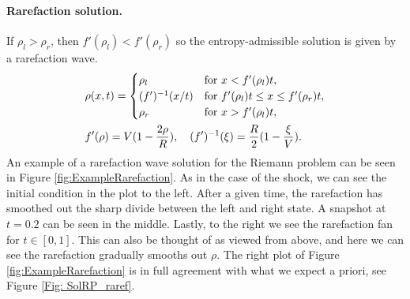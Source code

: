 \documentclass[10pt]{article}
\numberwithin{equation}{section}
\begin{document}
\paragraph{Rarefaction solution.} If $\rho_l > \rho_r$, then $f'(\rho_l) < f'(\rho_r) $ so the entropy-admissible solution is given by a rarefaction wave.
\begin{align}
    & \rho(x,t) = \begin{cases}
    \rho_l & \text{for $x < f'(\rho_l)t$, } \\
    (f')^{-1}(x/t)  &  \text{for $ f'(\rho_l)t \leq x \leq f'(\rho_r)t$,} \\
     \rho_r & \text{for $x > f'(\rho_l)t$, }
    \end{cases} \nonumber \\
    & f'(\rho) = V(1-\frac{2 \rho}{R}) , \quad  (f')^{-1}(\xi) = \frac{R}{2}(1-\frac{\xi}{V}).
    \label{Eq:CharacteristicSpeed}
\end{align}
An example of a rarefaction wave solution for the Riemann problem can be seen in Figure \ref{fig:ExampleRarefaction}. As in the case of the shock, we can see the initial condition in the plot to the left. After a given time, the rarefaction has smoothed out the sharp divide between the left and right state. A snapshot at $t = 0.2$ can be seen in the middle. Lastly, to the right we see the rarefaction fan for $t \in [0,1]$. This can also be thought of as viewed from above, and here we can see the rarefaction gradually smooths out $\rho$. The right plot of Figure \ref{fig:ExampleRarefaction} is in full agreement with what we expect a priori, see Figure \ref{Fig: SolRP_raref}.
\end{document}
